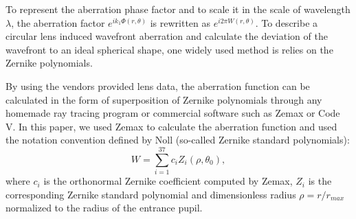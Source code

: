 \documentclass[9pt,twocolumn,twoside]{osajnl}
\begin{document}
To represent the aberration phase factor and to scale it in the scale of wavelength $\lambda$, the aberration factor $e^{ik_1\Phi(r,\theta)}$ is rewritten as $e^{i2\pi W(r,\theta)}$. To describe a circular lens induced wavefront aberration and calculate the deviation of the wavefront to an ideal spherical shape, one widely used method is relies on the Zernike polynomials.  %

By using the vendors provided lens data, the aberration function can be calculated in the form of superposition of Zernike polynomials through any homemade ray tracing program or commercial software such as Zemax or Code V. In this paper, we used Zemax \cite{Zemax} to calculate the aberration function and used the notation convention defined by Noll \cite{Noll1976} (so-called Zernike standard polynomials):
\begin{equation}\label{eq:22b}
	W = \sum_{i=1}^{37}c_iZ_i(\rho,\theta_0),
\end{equation}
where $c_i$ is the orthonormal Zernike coefficient computed by Zemax, $Z_i$ is the corresponding Zernike standard polynomial and dimensionless radius $\rho = r/r_{max}$ normalized to the radius of the entrance pupil.
\end{document}
